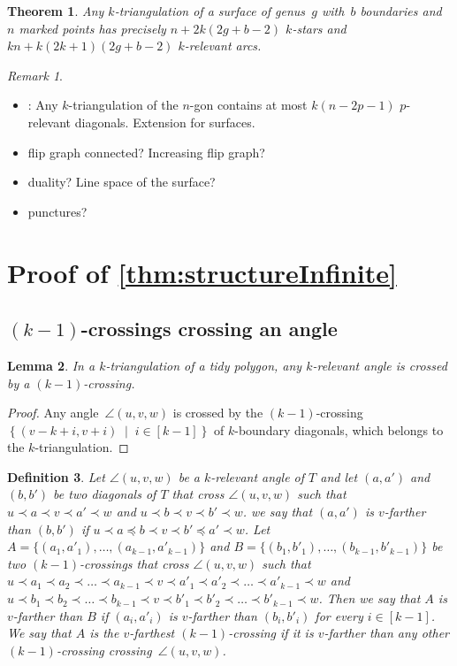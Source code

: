 \documentclass{amsart}
\newtheorem{theorem}{Theorem}[section]
\newtheorem{lemma}[theorem]{Lemma}
\newtheorem{definition}[theorem]{Definition}
\theoremstyle{remark}
\newtheorem{remark}{Remark}[section]
\newcommand{\darkblue}{\color{darkblue}} %
\newcommand{\defn}[1]{\textsl{\darkblue #1}} %
\newcommand*{\ktg}[0]{$k$-triangulation\xspace}
\newcommand{\cl}{\prec}
\newcommand{\cle}{\preccurlyeq}
\newcommand{\set}[2]{\left\{ #1 \;\middle|\; #2 \right\}} %
\begin{document}
\begin{theorem}
\label{thm:structureSurface}
Any \ktg of a surface of genus~$g$ with~$b$ boundaries and~$n$ marked points has precisely $n + 2k(2g + b - 2)$ $k$-stars and $kn + k(2k + 1)(2g + b - 2)$ $k$-relevant arcs.
\end{theorem}


\begin{remark}
\begin{itemize}
\item \cite[Lem.~7.10]{PilaudSantos}: Any $k$-triangulation of the $n$-gon contains at most $k(n-2p-1)$ $p$-relevant diagonals. Extension for surfaces.
\item flip graph connected? Increasing flip graph?
\item duality? Line space of the surface?
\item punctures?
\end{itemize}
\end{remark}

\section{Proof of \cref{thm:structureInfinite}}

\subsection{$(k-1)$-crossings crossing an angle}

\begin{lemma}
In a \ktg of a tidy polygon, any $k$-relevant angle is crossed by a $(k-1)$-crossing.
\end{lemma}
\begin{proof}
Any angle~$\angle(u,v,w)$ is crossed by the $(k-1)$-crossing~$\set{(v-k+i, v+i)}{i \in [k-1]}$ of $k$-boundary diagonals, which belongs to the \ktg.
\end{proof}

\begin{definition}
Let $\angle(u,v,w)$ be a $k$-relevant angle of $T$ and let $(a, a')$ and $(b ,b')$ be two diagonals of $T$ that cross $\angle(u,v,w)$ such that $u \cl a \cl v \cl a' \cl w$ and $u \cl b \cl v \cl b' \cl w$. we say that $(a, a')$ is \defn{$v$-farther} than $(b, b')$ if $u \cl a \cle b \cl v \cl b' \cle a' \cl w$. Let $A = \{(a_1, a'_1), \dots, (a_{k-1}, a'_{k-1})\}$ and $B = \{(b_1, b'_1), \dots,(b_{k-1}, b'_{k-1})\}$ be two $(k-1)$-crossings that cross $\angle(u,v,w)$ such that $u \cl a_1 \cl a_2 \cl \dots \cl a_{k-1} \cl v \cl a'_1 \cl a'_2 \cl \dots \cl a'_{k-1} \cl w$ and $u \cl b_1 \cl b_2 \cl \dots \cl b_{k-1} \cl v \cl b'_1 \cl b'_2 \cl \dots \cl b'_{k-1} \cl w$. Then we say that $A$ is \defn{$v$-farther} than $B$ if $(a_i, a'_i)$ is $v$-farther than $(b_i, b'_i)$ for every $i \in [k-1]$. We say that $A$ is the \defn{$v$-farthest} $(k-1)$-crossing if it is $v$-farther than any other $(k-1)$-crossing crossing~$\angle(u,v,w)$.
\end{definition}
\end{document}
